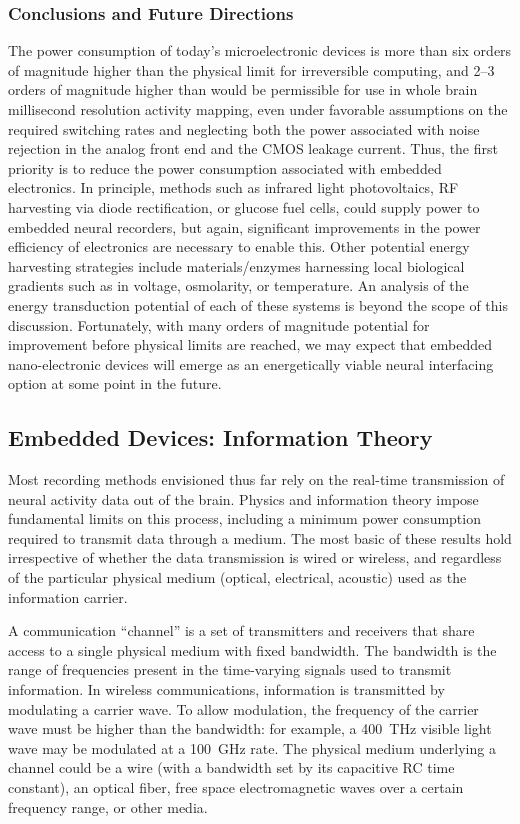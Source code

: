 \subsubsection{Conclusions and Future Directions}
The power consumption of today's microelectronic devices is more than six orders of magnitude higher than the physical limit for irreversible computing, and 2--3 orders of magnitude higher than would be permissible for use in whole brain millisecond resolution activity mapping, even under favorable assumptions on the required switching rates and neglecting both the power associated with noise rejection in the analog front end and the CMOS leakage current.
Thus, the first priority is to reduce the power consumption associated with embedded electronics.
In principle, methods such as infrared light photovoltaics, RF harvesting via diode rectification, or glucose fuel cells, could supply power to embedded neural recorders, but again, significant improvements in the power efficiency of electronics are necessary to enable this.
Other potential energy harvesting strategies include materials/enzymes harnessing local biological gradients such as in voltage, osmolarity, or temperature.
An analysis of the energy transduction potential of each of these systems is beyond the scope of this discussion.
Fortunately, with many orders of magnitude potential for improvement before physical limits are reached, we may expect that embedded nano-electronic devices will emerge as an energetically viable neural interfacing option at some point in the future.

\subsection{Embedded Devices: Information Theory}

Most recording methods envisioned thus far rely on the real-time transmission of neural activity data out of the brain.
Physics and information theory impose fundamental limits on this process, including a minimum power consumption required to transmit data through a medium.
The most basic of these results hold irrespective of whether the data transmission is wired or wireless, and regardless of the particular physical medium (optical, electrical, acoustic) used as the information carrier.

A communication ``channel'' is a set of transmitters and receivers that share access to a single physical medium with fixed bandwidth.
The bandwidth is the range of frequencies present in the time-varying signals used to transmit information.
In wireless communications, information is transmitted by modulating a carrier wave.
To allow modulation, the frequency of the carrier wave must be higher than the bandwidth: for example, a \SI{400}{\tera\hertz} visible light wave may be modulated at a \SI{100}{\giga\hertz} rate.
The physical medium underlying a channel could be a wire (with a bandwidth set by its capacitive RC time constant), an optical fiber, free space electromagnetic waves over a certain frequency range, or other media.

